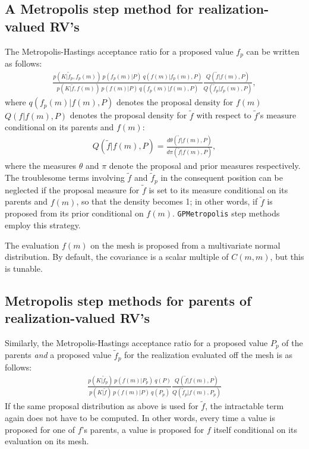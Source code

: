 \documentclass{report}
\begin{document}
\subsection{A Metropolis step method for realization-valued RV's}
The Metropolis-Hastings acceptance ratio for a proposed value $f_p$ can be written as follows:
\begin{eqnarray*}
    \frac{p(K|\tilde f_p, f_p(m))\ p(f_p(m) | P)\ q(f(m)|f_p(m),P)}{p(K|\tilde f, f(m))\ p(f(m) | P)\ q(f_p(m)|f(m),P)} \frac{Q(\tilde f|f(m),P)}{Q(\tilde f_p|f_p(m), P)} ,
\end{eqnarray*}
where $q(f_p(m)|f(m),P)$ denotes the proposal density for $f(m)$ $Q(f|f(m), P)$ denotes the proposal density for $\tilde f$ with respect to $\tilde f$'s measure conditional on its parents and $f(m)$:
\begin{eqnarray*}
    Q(\tilde f|f(m),P) = \frac{d\theta(\tilde f|f(m),P)}{d\pi(\tilde f|f(m),P)},
\end{eqnarray*}
where the measures $\theta$ and $\pi$ denote the proposal and prior measures respectively. The troublesome terms involving $\tilde f$ and $\tilde f_p$ in the consequent position can be neglected if the proposal measure for $\tilde f$ is set to its measure conditional on its parents and $f(m)$, so that the density becomes 1; in other words, if $\tilde f$ is proposed from its prior conditional on $f(m)$. \texttt{GPMetropolis} step methods employ this strategy.

The evaluation $f(m)$ on the mesh is proposed from a multivariate normal distribution. By default, the covariance is a scalar multiple of $C(m,m)$, but this is tunable.

\subsection{Metropolis step methods for parents of realization-valued RV's}
Similarly, the Metropolis-Hastings acceptance ratio for a proposed value $P_p$ of the parents \emph{and} a proposed value $\tilde f_p$ for the realization evaluated off the mesh is as follows:
\begin{eqnarray*}
    \frac{p(K|\tilde f_p)\ p(f(m) | P_p)\ q(P)}{p(K|\tilde f)\ p(f(m) | P)\ q(P_p)} \frac{Q(\tilde f|f(m),P)}{Q(\tilde f_p|f(m), P_p)}
\end{eqnarray*}
If the same proposal distribution as above is used for $\tilde f$, the intractable term again does not have to be computed. In other words, every time a value is proposed for one of $f$'s parents, a value is proposed for $f$ itself conditional on its evaluation on its mesh.
\end{document}
